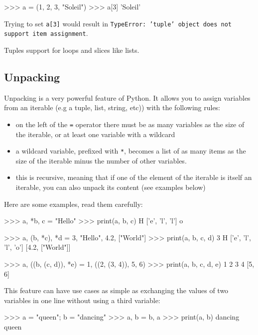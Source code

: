 \documentclass[twocolumn]{article}
\begin{document}
\begin{python}
>>> a = (1, 2, 3, "Soleil")
>>> a[3]
'Soleil'
\end{python}

Trying to set \texttt{a[3]} would result in \texttt{TypeError: 'tuple' object does not support item assignment}.

Tuples support for loops and slices like lists.

\subsection{Unpacking}\label{unpacking}

Unpacking is a very powerful feature of Python. It allows you to assign variables from an iterable (e.g a tuple, list, string, etc)) with the following rules:

\begin{itemize}
\item on the left of the \texttt{=} operator there must be as many variables as the size of the iterable, or at least one variable with a wildcard
\item a wildcard variable, prefixed with \texttt{*}, becomes a list of as many items as the size of the iterable minus the number of other variables.
\item this is recursive, meaning that if one of the element of the iterable is itself an iterable, you can also unpack its content (see examples below)
\end{itemize}

Here are some examples, read them carefully:
\begin{python}
>>> a, *b, c = "Hello"
>>> print(a, b, c)
H ['e', 'l', 'l'] o
\end{python}

\begin{python}
>>> a, (b, *c), *d = 3, "Hello", 4.2, ["World"]
>>> print(a, b, c, d)
3 H ['e', 'l', 'l', 'o'] [4.2, ["World"]]
\end{python}

\begin{python}
>>> a, ((b, (c, d)), *e) = 1, ((2, (3, 4)), 5, 6)
>>> print(a, b, c, d, e)
1 2 3 4 [5, 6]
\end{python}


This feature can have use cases as simple as exchanging the values of two variables in one line without using a third variable:
\begin{python}
>>> a = "queen"; b = "dancing"
>>> a, b = b, a
>>> print(a, b)
dancing queen
\end{python}
\end{document}

